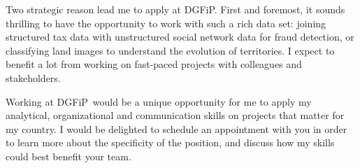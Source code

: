 \documentclass[11pt, a4paper]{awesome-cv}
\newcommand{\company}{DGFiP}
\begin{document}
\begin{cvletter}
Two strategic reason lead me to apply at \company.    
First and foremost, it sounds thrilling to have the opportunity to work with such a rich data set: joining structured tax data with unstructured social network data for fraud detection, or classifying land images to understand the evolution of territories. I expect to benefit a lot from working on fast-paced projects with colleagues and stakeholders. 

Working at \company~would be a unique opportunity for me to apply my analytical, organizational and communication skills on projects that matter for my country.  
I would be delighted to schedule an appointment with you in order to learn more about the specificity of the position, and discuss how my skills could best benefit your team. 
\end{cvletter}


\makeletterclosing
\end{document}
